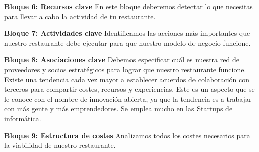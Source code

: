 \begin{enumerate}[1.]
\textbf{Bloque 6: Recursos clave}\newline
En este bloque deberemos detectar lo que necesitas para llevar a cabo la actividad de tu restaurante.\newline

\textbf{Bloque 7: Actividades clave}\newline
Identificamos las acciones más importantes que nuestro restaurante debe ejecutar para que nuestro modelo de negocio funcione. \newline

\textbf{Bloque 8: Asociaciones clave}\newline
Debemos especificar cuál es nuestra red de proveedores y socios estratégicos para lograr que nuestro restaurante funcione.\newline
Existe una tendencia cada vez mayor a establecer acuerdos de colaboración con terceros para compartir costes, recursos y experiencias.\newline
Este es un aspecto que se le conoce con el nombre de innovación abierta, ya que la tendencia es a trabajar con más gente y más emprendedores. Se emplea mucho en las Startups de informática.\newline

\textbf{Bloque 9: Estructura de costes}\newline
Analizamos todos los costes necesarios para la viabilidad de nuestro restaurante. \newline

\end{enumerate} 
